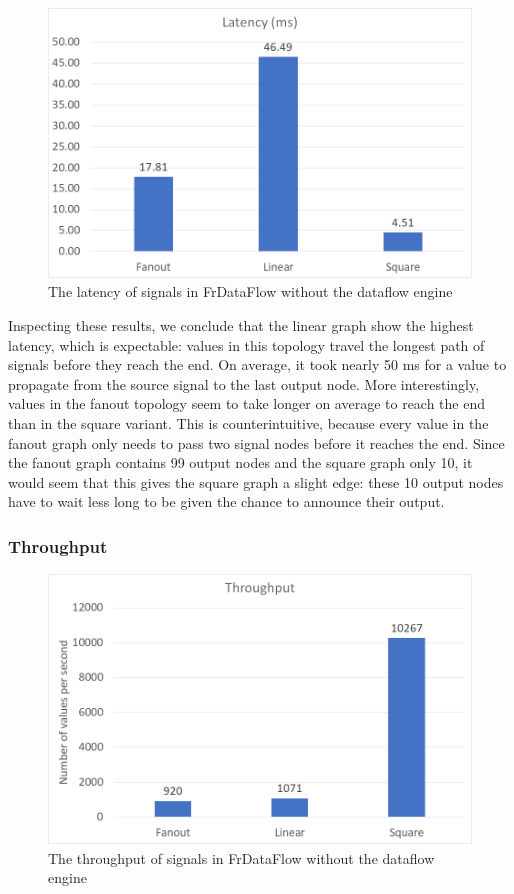 \begin{figure}[h]
	\includegraphics[width=\textwidth]{images/Evaluation-WithoutDataFlow-Latency.png}
	\caption{The latency of signals in FrDataFlow without the dataflow engine}
	\label{fig:evaluation-withoutdataflow-latency}
\end{figure}

Inspecting these results, we conclude that the linear graph show the highest latency, which is expectable: values in this topology travel the longest path of signals before they reach the end. On average, it took nearly 50 ms for a value to propagate from the source signal to the last output node.
More interestingly, values in the fanout topology seem to take longer on average to reach the end than in the square variant. This is counterintuitive, because every value in the fanout graph only needs to pass two signal nodes before it reaches the end. Since the fanout graph contains 99 output nodes and the square graph only 10, it would seem that this gives the square graph a slight edge: these 10 output nodes have to wait less long to be given the chance to announce their output. 

\subsubsection{Throughput}

\begin{figure}[h]
	\includegraphics[width=\textwidth]{images/Evaluation-WithoutDataFlow-Throughput.png}
	\caption{The throughput of signals in FrDataFlow without the dataflow engine}
	\label{fig:evaluation-withoutdataflow-throughput}
\end{figure}

